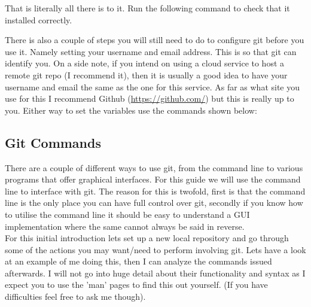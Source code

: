 \documentclass[a4paper,11pt]{report}
\begin{document}
\begin{description}
								

								That is literally all there is to it. Run the following command to check that it installed correctly.

								

								There is also a couple of steps you will still need to do to configure git before you use it. Namely setting your username and email address. This is so that git can identify you.
								On a side note, if you intend on using a cloud service to host a remote git repo (I recommend it), then it is usually a good idea to have your username and email the same as the one for this service.
								As far as what site you use for this I recommend Github (\url{https://github.com/}) but this is really up to you.
								Either way to set the variables use the commands shown below:

								

						\subsection{Git Commands}
							There are a couple of different ways to use git, from the command line to various programs that offer graphical interfaces. For this guide we will use the command line to interface with git.
							The reason for this is twofold, first is that the command line is the only place you can have full control over git, secondly if you know how to utilise the command line it should be easy to understand a GUI implementation where the same cannot always be said in reverse.\\

							For this initial introduction lets set up a new local repository and go through some of the actions you may want/need to perform involving git.
							Lets have a look at an example of me doing this, then I can analyze the commands issued afterwards. I will not go into huge detail about their functionality and syntax as I expect you to use the 'man' pages to find this out yourself. (If you have difficulties feel free to ask me though).

							


\end{description}
\end{document}
